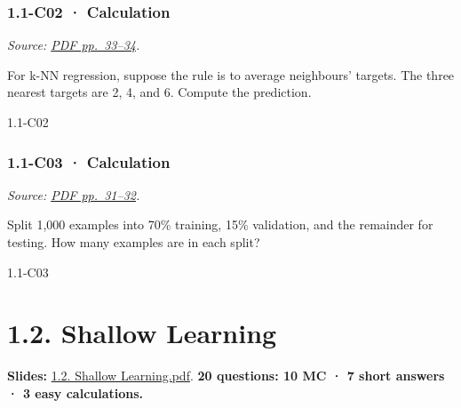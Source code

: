 \noindent\begin{minipage}{\linewidth}

\subsubsection{1.1-C02 · Calculation}\label{c02-calculation}

\emph{Source:
\href{../Lecture\%20Slides/1.1.\%20Fundamentals.pdf\#page=33}{PDF
pp.~33--34}.}

For k-NN regression, suppose the rule is to average neighbours' targets.
The three nearest targets are 2, 4, and 6. Compute the prediction.

\begin{solution}[26mm]{1.1-C02}

\end{solution}
\end{minipage}\par\medskip

\noindent\begin{minipage}{\linewidth}

\subsubsection{1.1-C03 · Calculation}\label{c03-calculation}

\emph{Source:
\href{../Lecture\%20Slides/1.1.\%20Fundamentals.pdf\#page=31}{PDF
pp.~31--32}.}

Split 1,000 examples into 70\% training, 15\% validation, and the
remainder for testing. How many examples are in each split?

\begin{solution}[26mm]{1.1-C03}

\end{solution}
\end{minipage}\par\medskip

\clearpage

\section{1.2. Shallow Learning}\label{shallow-learning}

\textbf{Slides:}
\href{../Lecture\%20Slides/1.2.\%20Shallow\%20Learning.pdf}{1.2. Shallow
Learning.pdf}. \textbf{20 questions: 10 MC · 7 short answers · 3 easy
calculations.}

